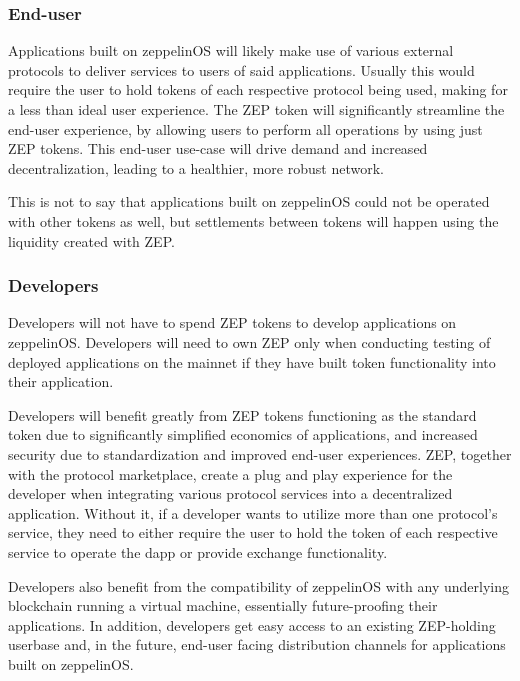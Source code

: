 \documentclass[]{article}
\makeatletter
\DeclareRobustCommand{\_}{%
  \leavevmode\vbox{%
    \hrule\@width.5em
          \@height-.26ex
          \@depth\dimexpr.26ex+.28pt\relax}}
\makeatother
\begin{document}
\subsubsection{End-user}

Applications built on zeppelinOS will likely make use of various
external protocols to deliver services to users of said applications.
Usually this would require the user to hold tokens of each respective
protocol being used, making for a less than ideal user experience. The
ZEP token will significantly streamline the end-user experience, by
allowing users to perform all operations by using just ZEP tokens.
This end-user use-case will drive demand and increased
decentralization, leading to a healthier, more robust network.

This is not to say that applications built on zeppelinOS could not be
operated with other tokens as well, but settlements between tokens will
happen using the liquidity created with ZEP.

\subsubsection{Developers}

Developers will not have to spend ZEP tokens to develop
applications on zeppelinOS. Developers will need to own ZEP only
when conducting testing of deployed applications on the mainnet if they
have built token functionality into their application.

Developers will benefit greatly from ZEP tokens functioning as the
standard token due to significantly simplified economics of
applications, and increased security due to standardization and improved
end-user experiences. ZEP, together with the protocol marketplace,
create a plug and play experience for the developer when integrating
various protocol services into a decentralized application. Without it,
if a developer wants to utilize more than one protocol's service,
they need to either require the user to hold the token of each
respective service to operate the dapp or provide exchange
functionality.

Developers also benefit from the compatibility of zeppelinOS with any
underlying blockchain running a virtual machine, essentially
future-proofing their applications. In addition, developers get easy
access to an existing ZEP-holding userbase and, in the future, end-user
facing distribution channels for applications built on zeppelinOS.
\end{document}
